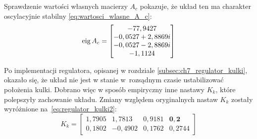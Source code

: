Sprawdzenie wartości własnych macierzy $A_c$ pokazuje, że układ ten ma charakter oscylacyjnie stabilny \eqref{eq:wartosci_wlasne_A_c}:
\begin{equation}
    \operatorname{eig}{A_c} = \begin{bmatrix}
     -77,9427 \\
     -0,0527 + 2,8869i \\
     -0,0527 - 2,8869i \\
     -1,1124
    \end{bmatrix} \label{eq:wartosci_wlasne_A_c}
\end{equation}

Po implementacji regulatora, opisanej w rozdziale \ref{subsec:ch7_regulator_kulki}, okazało się, że układ nie jest w stanie w~rozsądnym czasie ustabilizować położenia kulki. Dobrano więc w sposób empiryczny inne nastawy $K_k$, które polepszyły zachowanie układu. Zmiany względem oryginalnych nastaw $K_k$ zostały wyróżnione na~\eqref{eq:regulator_kulki2}:
\begin{equation}
K_k = \begin{bmatrix}
    1,7905 &  1,7813 &  0,9181 &  \mathbf{0,2} \\
    0,1802 & -0,4902 &  0,1762 &  0,2744
\end{bmatrix} \label{eq:regulator_kulki2}
\end{equation}

